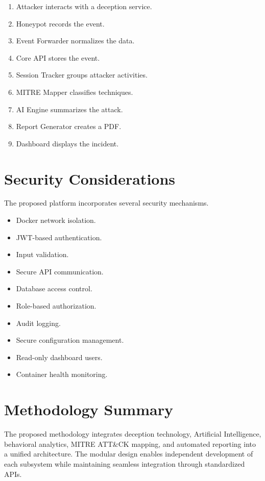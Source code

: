 \documentclass[12pt,a4paper]{report}
\begin{document}
\begin{enumerate}
\item Attacker interacts with a deception service.
\item Honeypot records the event.
\item Event Forwarder normalizes the data.
\item Core API stores the event.
\item Session Tracker groups attacker activities.
\item MITRE Mapper classifies techniques.
\item AI Engine summarizes the attack.
\item Report Generator creates a PDF.
\item Dashboard displays the incident.
\end{enumerate}


\section{Security Considerations}

The proposed platform incorporates several security mechanisms.

\begin{itemize}
\item Docker network isolation.
\item JWT-based authentication.
\item Input validation.
\item Secure API communication.
\item Database access control.
\item Role-based authorization.
\item Audit logging.
\item Secure configuration management.
\item Read-only dashboard users.
\item Container health monitoring.
\end{itemize}


\section{Methodology Summary}

The proposed methodology integrates deception technology, Artificial Intelligence, behavioral analytics, MITRE ATT\&CK mapping, and automated reporting into a unified architecture. The modular design enables independent development of each subsystem while maintaining seamless integration through standardized APIs.
\end{document}
